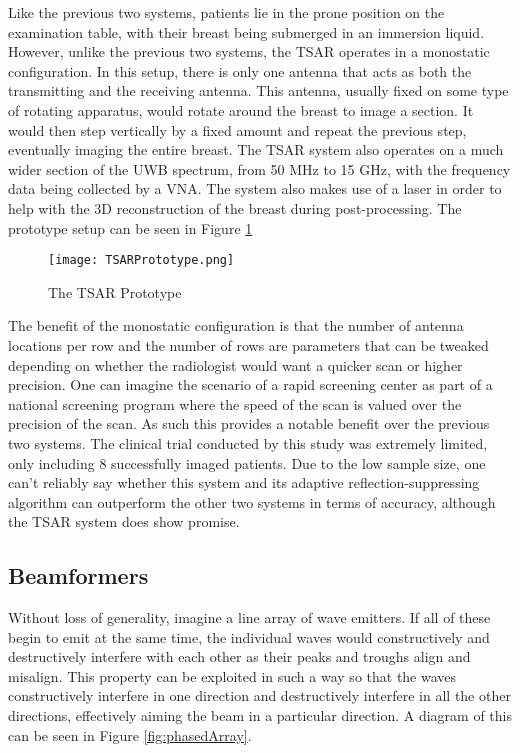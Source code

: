 Like the previous two systems, patients lie in the prone position on the examination table, with their breast being
submerged in an immersion liquid. However, unlike the previous two systems, the TSAR operates in a monostatic
configuration. In this setup, there is only one antenna that acts as both the transmitting and the receiving antenna.
This antenna, usually fixed on some type of rotating apparatus, would rotate around the breast to image a section. It
would then step vertically by a fixed amount and repeat the previous step, eventually imaging the entire breast. The
TSAR system also operates on a much wider section of the UWB spectrum, from 50 MHz to 15 GHz, with the frequency data
being collected by a VNA. The system also makes use of a laser in order to help with the 3D reconstruction of the breast
during post-processing. The prototype setup can be seen in Figure \ref{fig:TSARPrototype} \hfill \break

\begin{figure}
    \texttt{[image: TSARPrototype.png]}
    \centering
    \caption{The TSAR Prototype \cite{bourquiPrototypeSystemMeasuring2012}}
    \label{fig:TSARPrototype}
\end{figure}

The benefit of the monostatic configuration is that the number of antenna locations per row and the number of rows are
parameters that can be tweaked depending on whether the radiologist would want a quicker scan or higher precision. One
can imagine the scenario of a rapid screening center as part of a national screening program where the speed of the scan
is valued over the precision of the scan. As such this provides a notable benefit over the previous two systems. The
clinical trial conducted by this study was extremely limited, only including 8 successfully imaged patients. Due to the
low sample size, one can't reliably say whether this system and its adaptive reflection-suppressing algorithm can
outperform the other two systems in terms of accuracy, although the TSAR system does show promise. \hfill 

\subsection{Beamformers}
Without loss of generality, imagine a line array of wave emitters. If all of these begin to emit at the same time, the
individual waves would constructively and destructively interfere with each other as their peaks and troughs align and
misalign. This property can be exploited in such a way so that the waves constructively interfere in one direction and
destructively interfere in all the other directions, effectively aiming the beam in a particular direction. A diagram
of this can be seen in Figure \ref{fig:phasedArray}.


